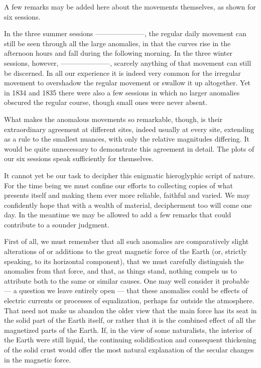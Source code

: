 A few remarks may be added here about the movements themselves, as shown for six sessions.

In the three summer sessions ---\quad---\quad---\quad---\quad---\quad---\quad---, the regular daily movement can still be seen through all the large anomalies, in that the curves rise in the afternoon hours and fall during the following morning. In the three winter sessions, however, ---\quad---\quad---\quad---\quad---\quad---\quad---, scarcely anything of that movement can still be discerned. In all our experience it is indeed very common for the irregular movement to overshadow the regular movement or swallow it up altogether. Yet in 1834 and 1835 there were also a few sessions in which no larger anomalies obscured the regular course, though small ones were never absent.

What makes the anomalous movements so remarkable, though, is their extraordinary agreement at different sites, indeed usually at every site, extending as a rule to the smallest nuances, with only the relative magnitudes differing. It would be quite unnecessary to demonstrate this agreement in detail. The plots of our six sessions speak sufficiently for themselves.

It cannot yet be our task to decipher this enigmatic hieroglyphic script of nature. For the time being we must confine our efforts to collecting copies of what presents itself and making them ever more reliable, faithful and varied. We may confidently hope that with a wealth of material, decipherment too will come one day. In the meantime we may be allowed to add a few remarks that could contribute to a sounder judgment.

First of all, we must remember that all such anomalies are comparatively slight alterations of or additions to the great magnetic force of the Earth (or, strictly speaking, to its horizontal component), that we must carefully distinguish the anomalies from that force, and that, as things stand, nothing compels us to attribute both to the same or similar causes. One may well consider it probable --- a question we leave entirely open --- that these anomalies could be effects of electric currents or processes of equalization, perhaps far outside the atmosphere. That need not make us abandon the older view that the main force has its seat in the solid part of the Earth itself, or rather that it is the combined effect of all the magnetized parts of the Earth. If, in the view of some naturalists, the interior of the Earth were still liquid, the continuing solidification and consequent thickening of the solid crust would offer the most natural explanation of the secular changes in the magnetic force.

